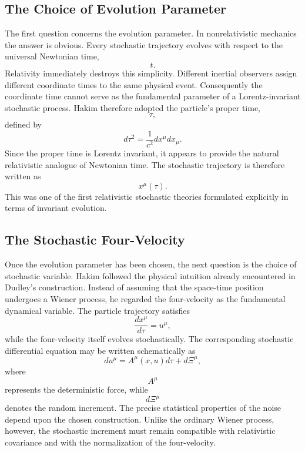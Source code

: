 \subsection{The Choice of Evolution Parameter}
The first question concerns the evolution parameter.
In nonrelativistic mechanics the answer is obvious.
Every stochastic trajectory evolves with respect to the universal
Newtonian time,
\[t.\]
Relativity immediately destroys this simplicity.
Different inertial observers assign different coordinate times to the
same physical event.
Consequently the coordinate time cannot serve as the fundamental
parameter of a Lorentz-invariant stochastic process.
Hakim therefore adopted the particle's proper time,
\[\tau,\]
defined by
\begin{equation}
d\tau^2=\frac{1}{c^2}dx^\mu dx_\mu .
\label{eq:ProperTime}
\end{equation}
Since the proper time is Lorentz invariant, it appears to provide the
natural relativistic analogue of Newtonian time.
The stochastic trajectory is therefore written as
\[x^\mu(\tau).\]
This was one of the first relativistic stochastic theories formulated
explicitly in terms of invariant evolution.
\subsection{The Stochastic Four-Velocity}
Once the evolution parameter has been chosen, the next question is the
choice of stochastic variable.
Hakim followed the physical intuition already encountered in Dudley's
construction.
Instead of assuming that the space-time position undergoes a Wiener
process, he regarded the four-velocity as the fundamental dynamical
variable.
The particle trajectory satisfies
\begin{equation}
\frac{dx^\mu}{d\tau}=u^\mu ,
\label{eq:HakimVelocity}
\end{equation}
while the four-velocity itself evolves stochastically.
The corresponding stochastic differential equation may be written
schematically as
\begin{equation}
du^\mu=A^\mu(x,u)d\tau+d\Xi^\mu ,
\label{eq:HakimNoise}
\end{equation}
where
\[A^\mu\]
represents the deterministic force, while
\[d\Xi^\mu\]
denotes the random increment.
The precise statistical properties of the noise depend upon the chosen
construction.
Unlike the ordinary Wiener process, however, the stochastic increment
must remain compatible with relativistic covariance and with the
normalization of the four-velocity.
